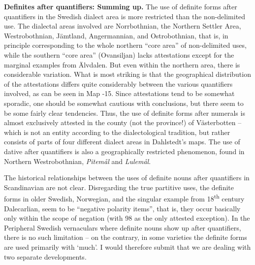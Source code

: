 \begin{styleBodytextC}
\textbf{Definites after quantifiers: Summing up. }The use of definite forms after quantifiers in the Swedish dialect area is more restricted than the non-delimited use. The dialectal areas involved are Norrbothnian, the Northern Settler Area, Westrobothnian, Jämtland, Angermannian, and Ostrobothnian, that is, in principle corresponding to the whole northern “core area” of non-delimited uses, while the southern “core area” (Ovansiljan) lacks attestations except for the marginal examples from Älvdalen. But even within the northern area, there is considerable variation. What is most striking is that the geographical distribution of the attestations differs quite considerably between the various quantifiers involved, as can be seen in Map {}-15. Since attestations tend to be somewhat sporadic, one should be somewhat cautious with conclusions, but there seem to be some fairly clear tendencies. Thus, the use of definite forms after numerals is almost exclusively attested in the county (not the province!) of Västerbotten – which is not an entity according to the dialectological tradition, but rather consists of parts of four different dialect areas in Dahlstedt’s maps. The use of dative after quantifiers is also a geographically restricted phenomenon, found in Northern Westrobothnian, \textit{Pitemål} and \textit{Lulemål}. 

\end{styleBodytextC}

\begin{styleBodytextC}
The historical relationships between the uses of definite nouns after quantifiers in Scandinavian are not clear. Disregarding the true partitive uses, the definite forms in older Swedish, Norwegian, and the singular example from 18\textsuperscript{th} century Dalecarlian, seem to be “negative polarity items”, that is, they occur basically only within the scope of negation (with 98 as the only attested exception). In the Peripheral Swedish vernaculars where definite nouns show up after quantifiers, there is no such limitation – on the contrary, in some varieties the definite forms are used primarily with ‘much’. I would therefore submit that we are dealing with two separate developments. 

\end{styleBodytextC}

\begin{stylecaption}
  [Warning: Image ignored] %
 

\end{stylecaption}

